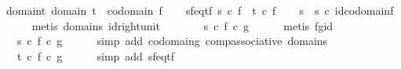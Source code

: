 \begin{isabellebody}
\ domain{\isacharunderscore}{\kern0pt}t{\isacharcolon}{\kern0pt}\ {\isachardoublequoteopen}domain\ t\ {\isacharequal}{\kern0pt}\ codomain\ f{\isachardoublequoteclose}\isanewline
\ \ \isamarkupfalse%
\ sf{\isacharunderscore}{\kern0pt}eq{\isacharunderscore}{\kern0pt}tf{\isacharcolon}{\kern0pt}\ {\isachardoublequoteopen}s\ {\isasymcirc}\isactrlsub c\ f\ {\isacharequal}{\kern0pt}\ t\ {\isasymcirc}\isactrlsub c\ f{\isachardoublequoteclose}\isanewline
\isanewline
\ \ \isamarkupfalse%
\ {\isachardoublequoteopen}s\ {\isacharequal}{\kern0pt}\ s\ {\isasymcirc}\isactrlsub c\ id{\isacharparenleft}{\kern0pt}codomain{\isacharparenleft}{\kern0pt}f{\isacharparenright}{\kern0pt}{\isacharparenright}{\kern0pt}{\isachardoublequoteclose}\isanewline
\ \ \ \ \isamarkupfalse%
\ {\isacharparenleft}{\kern0pt}metis\ domain{\isacharunderscore}{\kern0pt}s\ id{\isacharunderscore}{\kern0pt}right{\isacharunderscore}{\kern0pt}unit{\isacharparenright}{\kern0pt}\isanewline
\ \ \isamarkupfalse%
\ \isamarkupfalse%
\ {\isachardoublequoteopen}{\isachardot}{\kern0pt}{\isachardot}{\kern0pt}{\isachardot}{\kern0pt}\ {\isacharequal}{\kern0pt}\ s\ {\isasymcirc}\isactrlsub c\ {\isacharparenleft}{\kern0pt}f\ {\isasymcirc}\isactrlsub c\ g{\isacharparenright}{\kern0pt}{\isachardoublequoteclose}\isanewline
\ \ \ \ \isamarkupfalse%
\ {\isacharparenleft}{\kern0pt}metis\ fg{\isacharunderscore}{\kern0pt}id{\isacharparenright}{\kern0pt}\isanewline
\ \ \isamarkupfalse%
\ \isamarkupfalse%
\ {\isachardoublequoteopen}{\isachardot}{\kern0pt}{\isachardot}{\kern0pt}{\isachardot}{\kern0pt}\ {\isacharequal}{\kern0pt}\ {\isacharparenleft}{\kern0pt}s\ {\isasymcirc}\isactrlsub c\ f{\isacharparenright}{\kern0pt}\ {\isasymcirc}\isactrlsub c\ g{\isachardoublequoteclose}\isanewline
\ \ \ \ \isamarkupfalse%
\ {\isacharparenleft}{\kern0pt}simp\ add{\isacharcolon}{\kern0pt}\ codomain{\isacharunderscore}{\kern0pt}g\ comp{\isacharunderscore}{\kern0pt}associative\ domain{\isacharunderscore}{\kern0pt}s{\isacharparenright}{\kern0pt}\isanewline
\ \ \isamarkupfalse%
\ \isamarkupfalse%
\ {\isachardoublequoteopen}{\isachardot}{\kern0pt}{\isachardot}{\kern0pt}{\isachardot}{\kern0pt}\ {\isacharequal}{\kern0pt}\ {\isacharparenleft}{\kern0pt}t\ {\isasymcirc}\isactrlsub c\ f{\isacharparenright}{\kern0pt}\ {\isasymcirc}\isactrlsub c\ g{\isachardoublequoteclose}\isanewline
\ \ \ \ \isamarkupfalse%
\ {\isacharparenleft}{\kern0pt}simp\ add{\isacharcolon}{\kern0pt}\ sf{\isacharunderscore}{\kern0pt}eq{\isacharunderscore}{\kern0pt}tf{\isacharparenright}{\kern0pt}\isanewline

\end{isabellebody}

